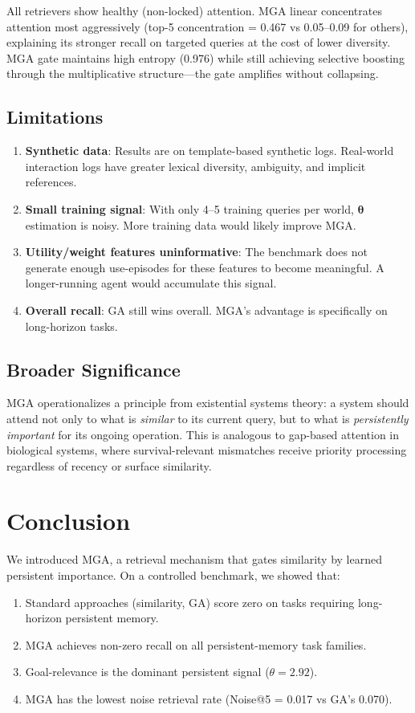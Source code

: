 \documentclass[11pt,a4paper]{article}
\begin{document}
All retrievers show healthy (non-locked) attention. MGA linear concentrates attention most aggressively (top-5 concentration = 0.467 vs 0.05--0.09 for others), explaining its stronger recall on targeted queries at the cost of lower diversity. MGA gate maintains high entropy (0.976) while still achieving selective boosting through the multiplicative structure---the gate amplifies without collapsing.

\subsection{Limitations}

\begin{enumerate}[leftmargin=2em]
\item \textbf{Synthetic data}: Results are on template-based synthetic logs. Real-world interaction logs have greater lexical diversity, ambiguity, and implicit references.
\item \textbf{Small training signal}: With only 4--5 training queries per world, $\boldsymbol{\theta}$ estimation is noisy. More training data would likely improve MGA.
\item \textbf{Utility/weight features uninformative}: The benchmark does not generate enough use-episodes for these features to become meaningful. A longer-running agent would accumulate this signal.
\item \textbf{Overall recall}: GA still wins overall. MGA's advantage is specifically on long-horizon tasks.
\end{enumerate}

\subsection{Broader Significance}

MGA operationalizes a principle from existential systems theory: a system should attend not only to what is \emph{similar} to its current query, but to what is \emph{persistently important} for its ongoing operation. This is analogous to gap-based attention in biological systems, where survival-relevant mismatches receive priority processing regardless of recency or surface similarity.

\section{Conclusion}

We introduced MGA, a retrieval mechanism that gates similarity by learned persistent importance. On a controlled benchmark, we showed that:
\begin{enumerate}[leftmargin=2em]
\item Standard approaches (similarity, GA) score zero on tasks requiring long-horizon persistent memory.
\item MGA achieves non-zero recall on all persistent-memory task families.
\item Goal-relevance is the dominant persistent signal ($\theta = 2.92$).
\item MGA has the lowest noise retrieval rate (Noise@5 = 0.017 vs GA's 0.070).
\end{enumerate}
\end{document}
